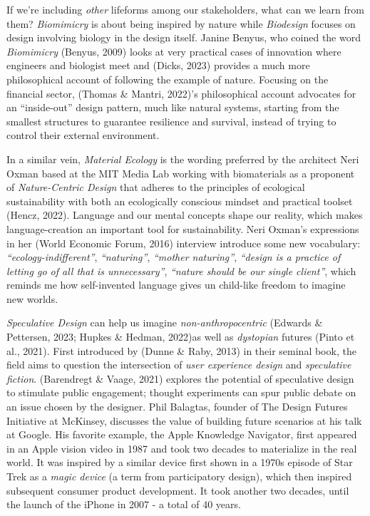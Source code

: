 \documentclass[
  letterpaper,
  DIV=11,
  numbers=noendperiod]{scrartcl}
\begin{document}
If we're including \emph{other} lifeforms among our stakeholders, what
can we learn from them? \emph{Biomimicry} is about being inspired by
nature while \emph{Biodesign} focuses on design involving biology in the
design itself. Janine Benyus, who coined the word \emph{Biomimicry}
(Benyus, 2009) looks at very practical cases of innovation where
engineers and biologist meet and (Dicks, 2023) provides a much more
philosophical account of following the example of nature. Focusing on
the financial sector, (Thomas \& Mantri, 2022)'s philosophical account
advocates for an ``inside-out'' design pattern, much like natural
systems, starting from the smallest structures to guarantee resilience
and survival, instead of trying to control their external environment.

In a similar vein, \emph{Material Ecology} is the wording preferred by
the architect Neri Oxman based at the MIT Media Lab working with
biomaterials as a proponent of \emph{Nature-Centric Design} that adheres
to the principles of ecological sustainability with both an ecologically
conscious mindset and practical toolset (Hencz, 2022). Language and our
mental concepts shape our reality, which makes language-creation an
important tool for sustainability. Neri Oxman's expressions in her
(World Economic Forum, 2016) interview introduce some new vocabulary:
\emph{``ecology-indifferent''}, \emph{``naturing''}, \emph{``mother
naturing''}, \emph{``design is a practice of letting go of all that is
unnecessary''}, \emph{``nature should be our single client''}, which
reminds me how self-invented language gives un child-like freedom to
imagine new worlds.

\emph{Speculative Design} can help us imagine \emph{non-anthropocentric}
(Edwards \& Pettersen, 2023; Hupkes \& Hedman, 2022)as well as
\emph{dystopian} futures (Pinto et al., 2021). First introduced by
(Dunne \& Raby, 2013) in their seminal book, the field aims to question
the intersection of \emph{user experience design} and \emph{speculative
fiction}. (Barendregt \& Vaage, 2021) explores the potential of
speculative design to stimulate public engagement; thought experiments
can spur public debate on an issue chosen by the designer. Phil
Balagtas, founder of The Design Futures Initiative at McKinsey,
discusses the value of building future scenarios at his talk at Google.
His favorite example, the Apple Knowledge Navigator, first appeared in
an Apple vision video in 1987 and took two decades to materialize in the
real world. It was inspired by a similar device first shown in a 1970s
episode of Star Trek as a \emph{magic device} (a term from participatory
design), which then inspired subsequent consumer product development. It
took another two decades, until the launch of the iPhone in 2007 - a
total of 40 years.
\end{document}
